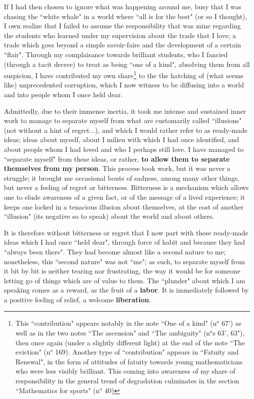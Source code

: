 If I had then chosen to ignore what was happening around me, busy that I was chasing the ``white whale" in a world where ``all is for the best" (or so I thought), I own realize that I failed to assume the responsibility that was mine regarding the students who learned under my supervision about the trade that I love; a trade which goes beyond a simple savoir-faire and the development of a certain ``flair". Through my complaisance towards brilliant students, who I fancied (through a tacit decree) to treat as being ``one of a kind", absolving them from all suspicion, I have contributed my own share\footnote{This ``contribution" appears notably in the note ``One of a kind" (n$^o$ 67') as well as in the two notes ``The ascension" and ``The ambiguity" (n$^o$s 63', 63"), then once again (under a slightly different light) at the end of the note ``The eviction" (n$^o$ 169). Another type of ``contribution" appears in ``Fatuity and Renewal", in the form of attitudes of fatuity towards young mathematicians who were less visibly brilliant. This coming into awareness of my share of responsibility in the general trend of degradation culminates in the section ``Mathematics for sports" (n$^o$ 40)} to the the hatching of (what seems like) unprecedented corruption, which I now witness to be diffusing into a world and into people whom I once held dear.

Admittedly, due to their immense inertia, it took me intense and sustained inner work to manage to separate myself from what are customarily called ``illusions" (not without a hint of regret...), and which I would rather refer to as ready-made ideas; ideas about myself, about I milieu with which I had once identified, and about people whom I had loved and who I perhaps still love. I have managed to ``separate myself" from these ideas, or rather, \textbf{to allow them to separate themselves from my person}. This process took work, but it was never a struggle; it brought me occasional bouts of sadness, among many other things, but never a feeling of regret or bitterness. Bitterness is a mechanism which allows one to elude awareness of a given fact, or of the message of a lived experience; it keeps one locked in a tenacious illusion about themselves, at the cost of another ``illusion" (its negative so to speak) about the world and about others.

It is therefore without bitterness or regret that I now part with these ready-made ideas which I had once ``held dear", through force of habit and because they had ``always been there". They had become almost like a second nature to me; nonetheless, this ``second nature" was not ``me"; as such, to separate myself from it bit by bit is neither tearing nor frustrating, the way it would be for someone letting go of things which are of value to them. The ``plunder" about which I am speaking comes as a reward, as the fruit of a \textbf{labor}. It is immediately followed by a positive feeling of relief, a welcome \textbf{liberation}.


